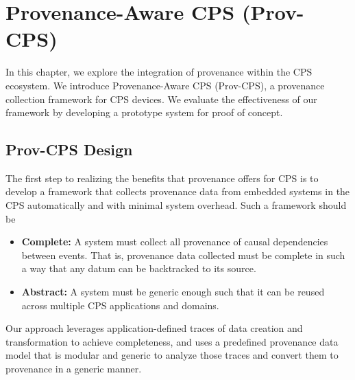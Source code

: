 
\chapter{Provenance-Aware CPS (Prov-CPS)}

In this chapter, we explore the integration of provenance within the CPS ecosystem. We introduce Provenance-Aware CPS (Prov-CPS), a  provenance collection framework for CPS devices. We evaluate the effectiveness of our framework by developing a prototype system for proof of concept.

\section{Prov-CPS Design}\label{sec:design}

The first step to realizing the benefits that provenance offers for CPS is to develop a framework that collects provenance data from embedded systems in the CPS automatically and with minimal system overhead. Such a framework should be

\begin{itemize}

\item \textbf{Complete:} A system must collect all provenance of causal dependencies between events. That is, provenance data collected must be complete in such a way that any datum can be backtracked to its source. %

\item \textbf{Abstract:} A system must be generic enough such that it can be reused across multiple CPS applications and domains. 

\end{itemize}

Our approach leverages application-defined traces of data creation and transformation to achieve completeness, and uses a predefined provenance data model that is modular and generic to analyze those traces and convert them to provenance in a generic manner.


